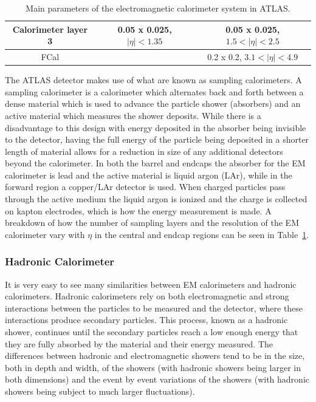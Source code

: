 \begin{table}
\begin{tabular}{ |c|c|c|}
  \hline
  Calorimeter layer 3 & 0.05 x 0.025, $\mid\eta\mid<1.35$       & 0.05 x 0.025, $1.5<\mid\eta\mid<2.5$ \\
  \hline
  FCal                &                                         & 0.2 x 0.2, $3.1<\mid\eta\mid < 4.9$ \\
  \hline
  \end{tabular}
  \caption[Main parameters of the electromagnetic calorimeter system. ]
        {\small Main parameters of the electromagnetic calorimeter system in ATLAS.\cite{1748-0221-3-08-S08003} }
\label{table:EMCalo}
\end{table}

The ATLAS detector makes use of what are known as sampling calorimeters.  
A sampling calorimeter is a calorimeter which alternates back and forth between a dense material which is used to advance the particle shower (absorbers) and an active material which measures the shower deposits.  
While there is a disadvantage to this design with energy deposited in the absorber being invisible to the detector, having the full energy of the particle being deposited in a shorter length of material allows for a reduction in size of any additional detectors beyond the calorimeter.  
In both the barrel and endcaps the absorber for the EM calorimeter is lead and the active material is liquid argon (LAr), while in the forward region a copper/LAr detector is used.  
When charged particles pass through the active medium the liquid argon is ionized and the charge is collected on kapton electrodes, which is how the energy measurement is made.  
A breakdown of how the number of sampling layers and the resolution of the EM calorimeter vary with $\eta$ in the central and endcap regions can be seen in Table~\ref{table:EMCalo}.  


\subsubsection{Hadronic Calorimeter}
\label{Had}
It is very easy to see many similarities between EM calorimeters and hadronic calorimeters.  
Hadronic calorimeters rely on both electromagnetic and strong interactions between the particles to be measured and the detector, where these interactions produce secondary particles.  
This process, known as a hadronic shower, continues until the secondary particles reach a low enough energy that they are fully absorbed by the material and their energy measured.  
The differences between hadronic and electromagnetic showers tend to be in the size, both in depth and width, of the showers (with hadronic showers being larger in both dimensions) and the event by event variations of the showers (with hadronic showers being subject to much larger fluctuations).  

